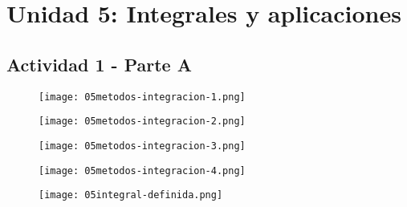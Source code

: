 \section*{Unidad 5: Integrales y aplicaciones}
%

\subsection*{Actividad 1 - Parte A}

\vspace{20pt}

\begin{figure}[H]
    \centering
    \texttt{[image: 05metodos-integracion-1.png]}
\end{figure}

\begin{figure}[H]
    \centering
    \texttt{[image: 05metodos-integracion-2.png]}
\end{figure}

\begin{figure}[H]
    \centering
    \texttt{[image: 05metodos-integracion-3.png]}
\end{figure}

\begin{figure}[H]
    \centering
    \texttt{[image: 05metodos-integracion-4.png]}
\end{figure}

\begin{figure}[H]
    \centering
    \texttt{[image: 05integral-definida.png]}
\end{figure}